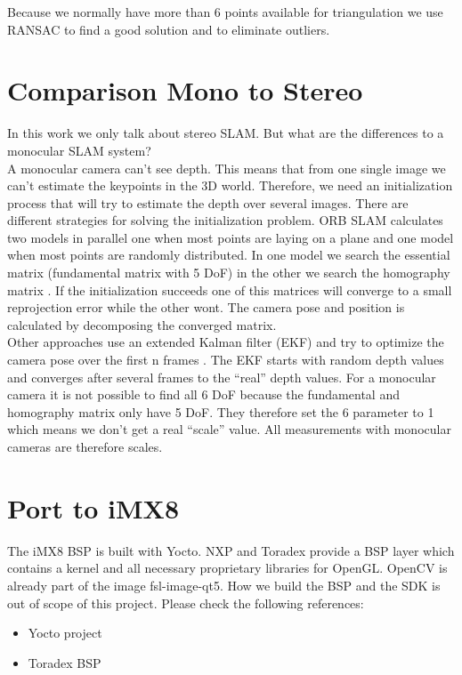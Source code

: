 \documentclass[11pt,a4paper,titlepage,oneside]{report}
\begin{document}
Because we normally have more than 6 points available for triangulation we use RANSAC \cite{ransac} to find a good solution and to eliminate outliers.

\section{Comparison Mono to Stereo}\label{sec:monster}

In this work we only talk about stereo SLAM. But what are the differences to a monocular SLAM system?\\
A monocular camera can't see depth. This means that from one single image we can't estimate the keypoints in the 3D world. Therefore, we need an initialization process that will try to estimate the depth over several images. There are different strategies for solving the initialization problem. ORB SLAM calculates two models in parallel one when most points are laying on a plane and one model when most points are randomly distributed. In one model we search the essential matrix (fundamental matrix with 5 DoF) in the other we search the homography matrix \cite{orbslam}. If the initialization succeeds one of this matrices will converge to a small reprojection error while the other wont. The camera pose and position is calculated by decomposing the converged matrix.\\
Other approaches use an extended Kalman filter (EKF) and try to optimize the camera pose over the first n frames \cite{svo}. The EKF starts with random depth values and converges after several frames to the ``real'' depth values. For a monocular camera it is not possible to find all 6 DoF because the fundamental and homography matrix only have 5 DoF. They therefore set the 6 parameter to 1 which means we don't get a real ``scale'' value. All measurements with monocular cameras are therefore scales.

\section{Port to iMX8}\label{sec:orbport}

The iMX8 BSP is built with Yocto. NXP and Toradex provide a BSP layer which contains a kernel and all necessary proprietary libraries for OpenGL. OpenCV is already part of the image fsl-image-qt5. How we build the BSP and the SDK is out of scope of this project. Please check the following references:\\
\begin{itemize}
	\item Yocto project \cite{yocto}
	\item Toradex BSP \cite{toradex_bsp}
\end{itemize}
\end{document}
